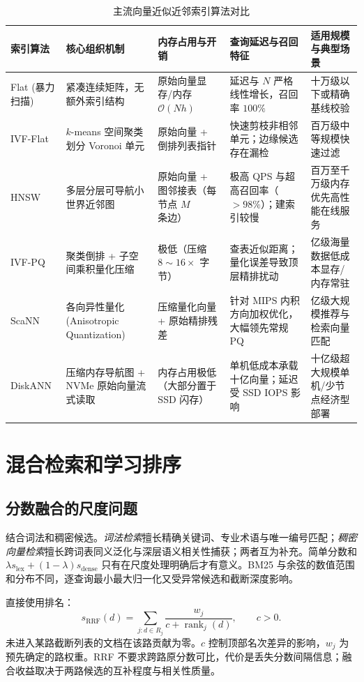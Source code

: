 \documentclass[../textbook.tex]{subfiles}
\begin{document}
\begin{table}[htbp]
\centering
\caption{主流向量近似近邻索引算法对比}\label{tab:ann-indexing}
\begin{tabularx}{\linewidth}{@{}lXXXX@{}}
\toprule
索引算法 & 核心组织机制 & 内存占用与开销 & 查询延迟与召回特征 & 适用规模与典型场景 \\
\midrule
Flat (暴力扫描) & 紧凑连续矩阵，无额外索引结构 & 原始向量显存/内存 $\mathcal O(Nh)$ & 延迟与 $N$ 严格线性增长，召回率 $100\%$ & 十万级以下或精确基线校验 \\
IVF-Flat & $k$-means 空间聚类划分 Voronoi 单元 & 原始向量 + 倒排列表指针 & 快速剪枝非相邻单元；边缘候选存在漏检 & 百万级中等规模快速过滤 \\
HNSW & 多层分层可导航小世界近邻图 & 原始向量 + 图邻接表（每节点 $M$ 条边） & 极高 QPS 与超高召回率（$>98\%$）；建索引较慢 & 百万至千万级内存优先高性能在线服务 \\
IVF-PQ & 聚类倒排 + 子空间乘积量化压缩 & 极低（压缩 $8\sim 16\times$ 字节） & 查表近似距离；量化误差导致顶层精排扰动 & 亿级海量数据低成本显存/内存常驻 \\
ScaNN & 各向异性量化 (Anisotropic Quantization) & 压缩量化向量 + 原始精排残差 & 针对 MIPS 内积方向加权优化，大幅领先常规 PQ & 亿级大规模推荐与检索向量匹配 \\
DiskANN & 压缩内存导航图 + NVMe 原始向量流式读取 & 内存占用极低（大部分置于 SSD 闪存） & 单机低成本承载十亿向量；延迟受 SSD IOPS 影响 & 十亿级超大规模单机/少节点经济型部署 \\
\bottomrule
\end{tabularx}
\end{table}

\section{混合检索和学习排序}

\subsection{分数融合的尺度问题}
结合词法和稠密候选。\emph{词法检索}擅长精确关键词、专业术语与唯一编号匹配；\emph{稠密向量检索}擅长跨词表同义泛化与深层语义相关性捕获；两者互为补充。简单分数和 $\lambda s_{\mathrm{lex}}+(1-\lambda)s_{\mathrm{dense}}$ 只有在尺度处理明确后才有意义。BM25 与余弦的数值范围和分布不同，逐查询最小最大归一化又受异常候选和截断深度影响。

直接使用排名\cite{cormack2009rrf}：
\begin{equation}
s_{\mathrm{RRF}}(d)=\sum_{j:d\in R_j}\frac{w_j}{c+\operatorname{rank}_j(d)},\qquad c>0.
\end{equation}
未进入某路截断列表的文档在该路贡献为零。$c$ 控制顶部名次差异的影响，$w_j$ 为预先确定的路权重。RRF 不要求跨路原分数可比，代价是丢失分数间隔信息；融合收益取决于两路候选的互补程度与相关性质量。
\end{document}
